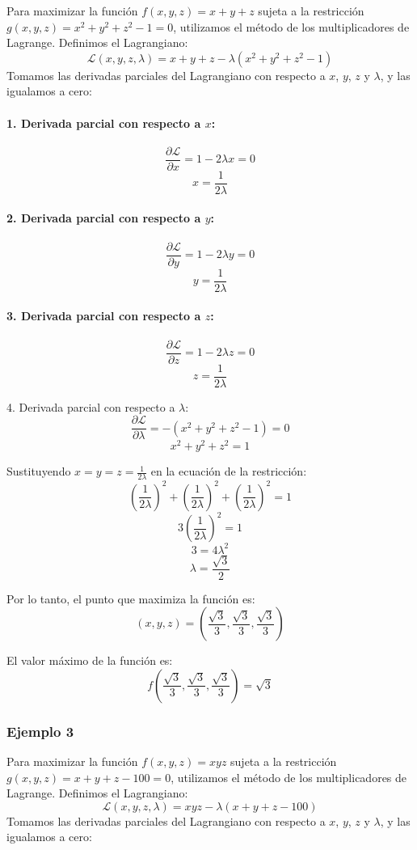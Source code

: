 \documentclass[11pt]{book}
\theoremstyle{definicion}
\theoremstyle{teorema}
\theoremstyle{ejemplo}
\begin{document}
\noindent
Para maximizar la función \( f(x, y, z) = x + y + z \) sujeta a la restricción \( g(x, y, z) = x^2 + y^2 + z^2 - 1 = 0 \), utilizamos el método de los multiplicadores de Lagrange.
%
Definimos el Lagrangiano:
\[ \mathcal{L}(x, y, z, \lambda) = x + y + z - \lambda (x^2 + y^2 + z^2 - 1) \]
%
Tomamos las derivadas parciales del Lagrangiano con respecto a \(x\), \(y\), \(z\) y \(\lambda\), y las igualamos a cero:

\paragraph{1. Derivada parcial con respecto a \(x\):}
\[ \frac{\partial \mathcal{L}}{\partial x} = 1 - 2 \lambda x = 0 \]
\[ x = \frac{1}{2 \lambda} \]

\paragraph{2. Derivada parcial con respecto a \(y\):}
\[ \frac{\partial \mathcal{L}}{\partial y} = 1 - 2 \lambda y = 0 \]
\[ y = \frac{1}{2 \lambda} \]

\paragraph{3. Derivada parcial con respecto a \(z\):}
\[ \frac{\partial \mathcal{L}}{\partial z} = 1 - 2 \lambda z = 0 \]
\[ z = \frac{1}{2 \lambda} \]

4. Derivada parcial con respecto a \(\lambda\):
\[ \frac{\partial \mathcal{L}}{\partial \lambda} = -(x^2 + y^2 + z^2 - 1) = 0 \]
\[ x^2 + y^2 + z^2 = 1 \]

Sustituyendo \( x = y = z = \frac{1}{2 \lambda} \) en la ecuación de la restricción:
\[ \left( \frac{1}{2 \lambda} \right)^2 + \left( \frac{1}{2 \lambda} \right)^2 + \left( \frac{1}{2 \lambda} \right)^2 = 1 \]
\[ 3 \left( \frac{1}{2 \lambda} \right)^2 = 1 \]
\[ 3 = 4 \lambda^2 \]
\[ \lambda = \frac{\sqrt{3}}{2} \]

Por lo tanto, el punto que maximiza la función es:
\[ (x, y, z) = \left( \frac{\sqrt{3}}{3}, \frac{\sqrt{3}}{3}, \frac{\sqrt{3}}{3} \right) \]

El valor máximo de la función es:
\[ f\left( \frac{\sqrt{3}}{3}, \frac{\sqrt{3}}{3}, \frac{\sqrt{3}}{3} \right) = \sqrt{3} \]



\subsubsection{Ejemplo 3}
Para maximizar la función \( f(x, y, z) = xyz \) sujeta a la restricción \( g(x, y, z) = x + y + z - 100 = 0 \), utilizamos el método de los multiplicadores de Lagrange.
%
Definimos el Lagrangiano:
\[ \mathcal{L}(x, y, z, \lambda) = xyz - \lambda (x + y + z - 100) \]
%
Tomamos las derivadas parciales del Lagrangiano con respecto a \(x\), \(y\), \(z\) y \(\lambda\), y las igualamos a cero:
\end{document}
